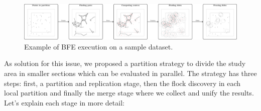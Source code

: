 \begin{figure}[!ht]
    \centering
    \includegraphics[width=1\textwidth]{figures/MF_stages/flow}
    \caption{Example of BFE execution on a sample dataset.}\label{fig:example}
\end{figure}

As solution for this issue, we proposed a partition strategy to divide the study area in smaller sections which can be evaluated in parallel.  The strategy has three steps: first, a partition and replication stage, then the flock discovery in each local partition and finally the merge stage where we collect and unify the results.  Let's explain each stage in more detail:


